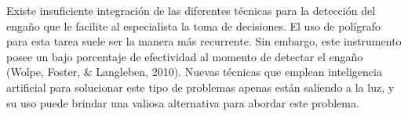 Existe insuficiente integración de las diferentes técnicas para la detección del engaño que le facilite al especialista la toma de decisiones. El uso de polígrafo para esta tarea suele ser la manera más recurrente. Sin embargo, este instrumento posee un bajo porcentaje de efectividad al momento de detectar el engaño (Wolpe, Foster, \& Langleben, 2010). Nuevas técnicas que emplean inteligencia artificial para solucionar este tipo de problemas apenas están saliendo a la luz, y su uso puede brindar una valiosa alternativa para abordar este problema.  